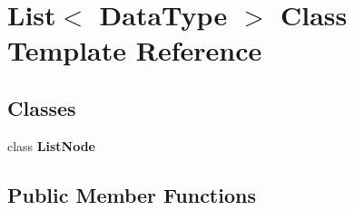 \hypertarget{class_list}{\section{\-List$<$ \-Data\-Type $>$ \-Class \-Template \-Reference}
\label{class_list}
}
\subsection*{\-Classes}
\begin{DoxyCompactItemize}
\item 
class {\bfseries \-List\-Node}
\end{DoxyCompactItemize}
\subsection*{\-Public \-Member \-Functions}
